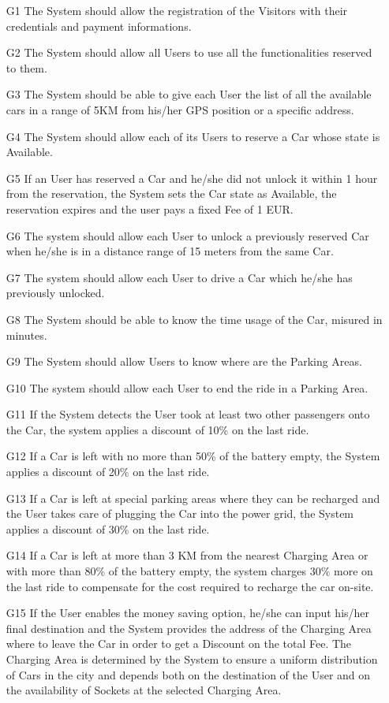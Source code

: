 \begin{enumerate}
	\item[G1] The System should allow the registration of the Visitors with their credentials and payment informations.
	\item[G2] The System should allow all Users to use all the functionalities reserved to them.
	\item[G3] The System should be able to give each User the list of all the available cars in a range of 5KM from his/her GPS position or a specific address.
	\item[G4] The System should allow each of its Users to reserve a Car whose state is Available.
	\item[G5] If an User has reserved a Car and he/she did not unlock it within 1 hour from the reservation, the System sets the Car state as Available, the reservation expires and the user pays a fixed Fee of 1 EUR.  
	\item[G6] The system should allow each User to unlock a previously reserved Car when he/she is in a distance range of 15 meters from the same Car.
	\item[G7] The system should allow each User to drive a Car which he/she has previously unlocked.
	\item[G8] The System should be able to know the time usage of the Car, misured in minutes.
	\item[G9] The System should allow Users to know where are the Parking Areas.
	\item[G10] The system should allow each User to end the ride in a Parking Area.
	\item[G11] If the System detects the User took at least two other passengers onto the Car, the system applies a discount of 10\% on the last ride. 
	\item[G12] If a Car is left with no more than 50\% of the battery empty, the System applies a discount of 20\% on the last ride. 
	\item[G13] If a Car is left at special parking areas where they can be recharged and the User takes care of plugging the Car into the power grid, the System applies a discount of 30\% on the last ride. 
	\item[G14] If a Car is left at more than 3 KM from the nearest Charging Area or with more than 80\% of the battery empty, the system charges 30\% more on the last ride to compensate for the cost required to recharge the car on-site.
	\item[G15] If the User enables the money saving option, he/she can input his/her final destination and the System provides the address of the Charging Area where to leave the Car in order to get a Discount on the total Fee. The Charging Area is determined by the System to ensure a uniform distribution of Cars in the city and depends both on the destination of the User and on the availability of Sockets at the selected Charging Area. 
\end{enumerate}


